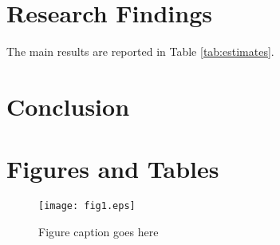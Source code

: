\documentclass[12pt,english]{article}
\begin{document}
\section{Research Findings}\label{sec:results}
The main results are reported in Table \ref{tab:estimates}.


\section{Conclusion}\label{sec:conclusion}


\vfill
\pagebreak{}
\begin{spacing}{1}


\end{spacing}

\vfill
\pagebreak{}
\clearpage

\section*{Figures and Tables}\label{sec:figTables}
\begin{figure}[ht]
\centering
\bigskip{}
\texttt{[image: fig1.eps]}
\caption{Figure caption goes here}
\label{fig:fig1}
\end{figure}
\end{document}
